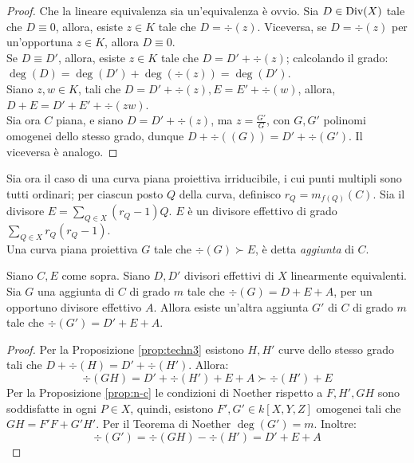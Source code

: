         \begin{proof}
            Che la lineare equivalenza sia un'equivalenza è ovvio. Sia $D \in 
            \text{Div}(X)$ tale che $D \equiv 0$, allora, esiste $z \in K$ tale che 
            $D = \div(z)$. Viceversa, se $D = \div(z)$ per un'opportuna $z \in 
            K$, allora $D \equiv 0$. \\
            Se $D \equiv D'$, allora, esiste $z \in K$ tale che $D = D' + 
            \div(z)$; calcolando il grado: $\deg(D) = \deg(D') + \deg(\div(z)) 
            = \deg(D')$.\\
            Siano $z,w \in K$, tali che $D = D' + \div(z), E = E' + \div(w)$, 
            allora, $D + E = D' + E' + \div(zw)$.\\
            Sia ora $C$ piana, e siano $D = D' + \div(z)$, ma $z = \frac{G'}{G}
            $, con $G,G'$ polinomi omogenei dello stesso grado, dunque $D + 
            \div((G)) = D' + \div(G')$. Il viceversa è analogo.
        \end{proof}
        Sia ora il caso di una curva piana proiettiva irriducibile, i cui 
        punti multipli sono tutti ordinari; per ciascun posto $Q$ della curva, 
        definisco $r_Q = m_{f(Q)}(C)$. Sia il divisore $E = \sum_{Q \in X} 
        (r_Q - 1)Q$. $E$ è un divisore effettivo di grado $\sum_{Q \in X} r_Q
        (r_Q -1)$. \\
        Una curva piana proiettiva $G$ tale che $\div(G) \succ E$, è detta 
        \emph{aggiunta} di $C$.
        \begin{teorema}
            Siano $C,E$ come sopra. Siano $D,D'$ divisori effettivi di $X$ 
            linearmente equivalenti. Sia $G$ una aggiunta di $C$ di grado $m$ 
            tale che $\div(G) = D + E + A$, per un opportuno divisore 
            effettivo $A$. Allora esiste un'altra aggiunta $G'$ di $C$ di 
            grado $m$ tale che $\div(G') = D' + E + A$.
        \end{teorema}
        \begin{proof}
            Per la Proposizione \ref{prop:techn3} esistono $H,H'$ curve dello 
            stesso grado tali che $D + \div(H) = D' + \div(H')$. Allora: 
            \begin{equation*}
                \div(GH) = D' + \div(H') + E + A \succ \div(H') + E
            \end{equation*}
            Per la Proposizione \ref{prop:n-c} le condizioni di Noether 
            rispetto a $F,H',GH$ sono soddisfatte in ogni $P \in X$, quindi, 
            esistono $F',G' \in k[X,Y,Z]$ omogenei tali che $GH = F'F + G'H'$. 
            Per il Teorema di Noether $\deg(G') = m$. Inoltre: 
            \begin{equation*}
                \div(G') = \div(GH) - \div(H') = D' + E + A    
            \end{equation*}
        \end{proof}
    \newpage
